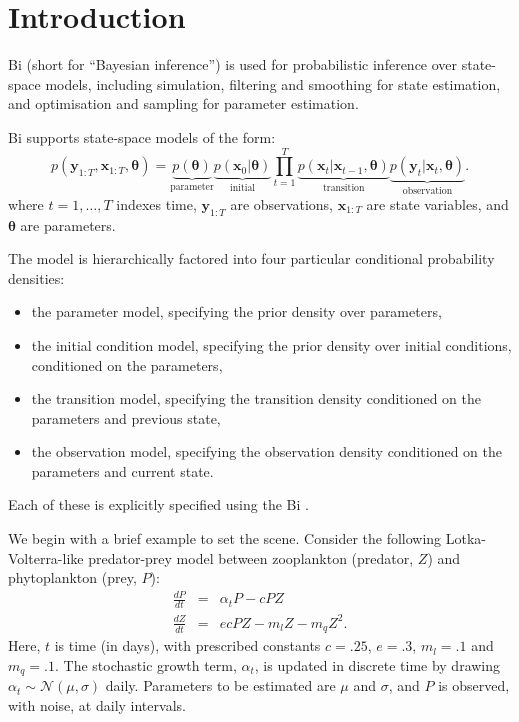 \section{Introduction\label{Introduction}}

Bi (short for ``Bayesian inference'') is used for probabilistic inference over
state-space models, including simulation, filtering and smoothing for state
estimation, and optimisation and sampling for parameter estimation.

Bi supports state-space models of the form:
\begin{equation*}
p(\mathbf{y}_{1:T},\mathbf{x}_{1:T},\boldsymbol{\theta}) =
\underbrace{p(\boldsymbol{\theta})}_{\text{parameter}}
\underbrace{p(\mathbf{x}_0|\boldsymbol{\theta})}_{\text{initial}}
\prod_{t=1}^T
\underbrace{p(\mathbf{x}_t|\mathbf{x}_{t-1},\boldsymbol{\theta})}_{\text{transition}}
\underbrace{p(\mathbf{y}_t|\mathbf{x}_t,\boldsymbol{\theta})}_{\text{observation}}.
\end{equation*}
where $t = 1,\ldots,T$ indexes time, $\mathbf{y}_{1:T}$ are observations,
$\mathbf{x}_{1:T}$ are state variables, and $\boldsymbol{\theta}$ are
parameters.

The model is hierarchically factored into four particular conditional
probability densities:
\begin{itemize}
\item the parameter model, specifying the prior density over parameters,
\item the initial condition model, specifying the prior density over initial
  conditions, conditioned on the parameters,
\item the transition model, specifying the transition density conditioned on
  the parameters and previous state,
\item the observation model, specifying the observation density conditioned on
  the parameters and current state.
\end{itemize}
Each of these is explicitly specified using the Bi
.

We begin with a brief example to set the scene. Consider the following
Lotka-Volterra-like predator-prey model between zooplankton (predator, $Z$)
and phytoplankton (prey, $P$):
\begin{eqnarray*}
\frac{dP}{dt} &=& \alpha_t P - cPZ\\
\frac{dZ}{dt} &=& ecPZ - m_lZ - m_q Z^2.
\end{eqnarray*}
Here, $t$ is time (in days), with prescribed constants $c = .25$, $e = .3$,
$m_l = .1$ and $m_q = .1$. The stochastic growth term, $\alpha_t$, is updated
in discrete time by drawing $\alpha_t \sim \mathcal{N}(\mu,\sigma)$
daily. Parameters to be estimated are $\mu$ and $\sigma$, and $P$ is observed,
with noise, at daily intervals.

